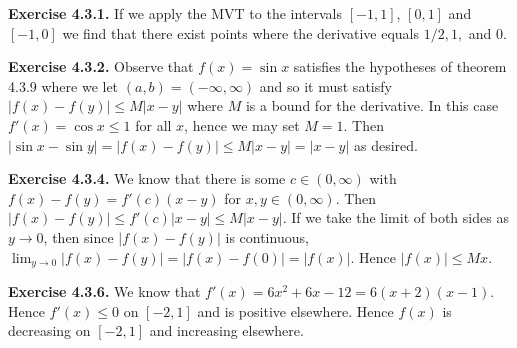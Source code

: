 \documentclass[12pt]{book}
\newenvironment{exercise}[2][Exercise]{\begin{trivlist}
\item[\hskip \labelsep {\bfseries #1}\hskip \labelsep {\bfseries #2.}]}{\end{trivlist}}
\newcommand{\prb}[1]{\textbf{Exercise #1.}}
\begin{document}
\begin{exercise}{1.4.6}
\prb{4.3.1} If we apply the MVT to the intervals $[-1, 1]$, $[0, 1]$ and $[-1, 0]$ we find that there exist points where the derivative equals $1/2, 1,$ and $0$. 

\prb{4.3.2} Observe that $f(x) = \sin x$ satisfies the hypotheses of theorem 4.3.9 where we let $(a,b) = (-\infty, \infty)$ and so it must satisfy $|f(x) - f(y)| \leq M |x-y|$ where $M$ is a bound for the derivative. In this case $f'(x) = \cos x \leq 1$ for all $x$, hence we may set $M = 1$. Then $|\sin x - \sin y| = |f(x) - f(y)| \leq M |x-y| = |x-y|$ as desired.

\begin{exercise}{4.3.3}
\end{exercise}

\prb{4.3.4} We know that there is some $c \in (0, \infty)$ with $f(x) - f(y) = f'(c) (x-y)$ for $x, y \in (0, \infty)$. Then $|f(x) - f(y)| \leq f'(c) |x-y| \leq M|x-y|$. If we take the limit of both sides as $y \rightarrow 0$, then since $|f(x) - f(y)|$ is continuous, $\displaystyle \lim_{y \rightarrow 0} |f(x) - f(y)| = |f(x) - f(0)| = |f(x)|$. Hence $|f(x)| \leq Mx$. 

\begin{exercise}{4.3.5}
\end{exercise}

\prb{4.3.6} We know that $f'(x) = 6x^2 + 6x - 12 = 6(x+2)(x-1)$. Hence $f'(x) \leq 0$ on $[-2, 1]$ and is positive elsewhere. Hence $f(x)$ is decreasing on $[-2, 1]$ and increasing elsewhere. 

\begin{exercise}{4.3.7}
\end{exercise}


\begin{exercise}{4.3.8}
\end{exercise}


\begin{exercise}{4.3.9}
\end{exercise}


\begin{exercise}{4.3.10}
\end{exercise}


\begin{exercise}{4.3.11}
\end{exercise}

\begin{exercise}{4.3.12}
\end{exercise}


\begin{exercise}{4.3.13}
\end{exercise}



\end{exercise}
\end{document}
